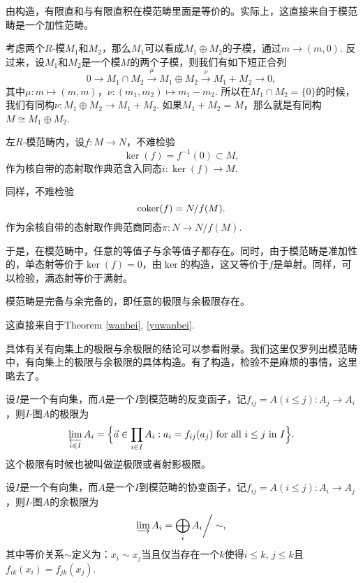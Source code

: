 由构造，有限直和与有限直积在模范畴里面是等价的。实际上，这直接来自于模范畴是一个加性范畴。

\begin{para}
考虑两个$R$-模$M_1$和$M_2$，那么$M_1$可以看成$M_1\oplus M_2$的子模，通过$m\to (m,0)$. 反过来，设$M_1$和$M_2$是一个模$M$的两个子模，则我们有如下短正合列
\[
	0\to M_1\cap M_2 \xrightarrow{\mu} M_1\oplus M_2\xrightarrow{\nu} M_1+M_2\to 0,
\]
其中$\mu:m\mapsto (m,m)$，$\nu:(m_1,m_2)\mapsto m_1-m_2$. 所以在$M_1\cap M_2=\{0\}$的时候，我们有同构$\nu: M_1\oplus M_2\to M_1+M_2$. 如果$M_1+M_2=M$，那么就是有同构$M\cong M_1\oplus M_2$.
\end{para}


\begin{para}[核与余核]
左$R$-模范畴内，设$f:M\to N$，不难检验
\[
	\ker(f)=f^{-1}(0)\subset M,
\]
作为核自带的态射取作典范含入同态$i:\ker(f)\to M$.

同样，不难检验
\[
	\operatorname{coker}(f)=N/f(M).
\]
作为余核自带的态射取作典范商同态$\pi:N\to N/f(M)$.
\end{para}

于是，在模范畴中，任意的等值子与余等值子都存在。同时，由于模范畴是准加性的，单态射等价于$\ker(f)=0$，由$\ker$的构造，这又等价于$f$是单射。同样，可以检验，满态射等价于满射。

\begin{thm}
模范畴是完备与余完备的，即任意的极限与余极限存在。
\end{thm}

这直接来自于Theorem \ref{wanbei}, \ref{yuwanbei}.

\begin{para}[有向集上的极限与余极限]
具体有关有向集上的极限与余极限的结论可以参看附录。我们这里仅罗列出模范畴中，有向集上的极限与余极限的具体构造。有了构造，检验不是麻烦的事情，这里略去了。

设$I$是一个有向集，而$A$是一个$I$到模范畴的反变函子，记$f_{ij}=A(i\leq j):A_j\to A_i$，则$I$-图$A$的极限为
\[
	\varprojlim _{i\in I}A_{i}={\Big \{}{\vec {a}}\in \prod _{i\in I}A_{i}\;{:}\;a_{i}=f_{ij}(a_{j}){\text{ for all }}i\leq j{\text{ in }}I{\Big \}}.
\]
这个极限有时候也被叫做逆极限或者射影极限。

设$I$是一个有向集，而$A$是一个$I$到模范畴的协变函子，记$f_{ij}=A(i\leq j):A_i\to A_j$，则$I$-图$A$的余极限为
\[
	\varinjlim A_{i}=\bigoplus_{i}A_{i}{\bigg /}\sim,
\]
其中等价关系$\sim$定义为：$x_i\sim x_j$当且仅当存在一个$k$使得$i\leq k$, $j\leq k$且$f_{ik}(x_{i})=f_{jk}(x_{j})$.
\end{para}

